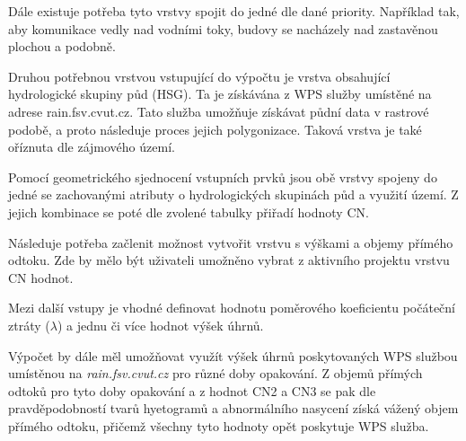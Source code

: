 \documentclass[a4paper,oneside,12pt]{book}
\begin{document}
\hspace{10mm}Dále existuje potřeba tyto vrstvy spojit do jedné dle dané priority. Například tak, aby komunikace vedly nad vodními toky, budovy se nacházely nad zastavěnou plochou a podobně.

\hspace{10mm}Druhou potřebnou vrstvou vstupující do výpočtu je vrstva obsahující hydrologické skupiny půd (HSG). Ta je získávána z WPS služby umístěné na adrese rain.fsv.cvut.cz. Tato služba umožňuje získávat půdní data v rastrové podobě, a proto následuje proces jejich polygonizace. Taková vrstva je také oříznuta dle zájmového území.

\hspace{10mm}Pomocí geometrického sjednocení vstupních prvků jsou obě vrstvy spojeny do jedné se zachovanými atributy o hydrologických skupinách půd a využití území.
Z jejich kombinace se poté dle zvolené tabulky přiřadí hodnoty CN.

\hspace{10mm} Následuje potřeba začlenit možnost vytvořit vrstvu s výškami a objemy přímého odtoku. Zde by mělo být uživateli umožněno vybrat z aktivního projektu vrstvu CN hodnot.

\hspace{10mm} Mezi další vstupy je vhodné definovat hodnotu poměrového koeficientu počáteční ztráty ($\lambda$) a jednu či více hodnot výšek úhrnů.

\hspace{10mm} Výpočet by dále měl umožňovat využít výšek úhrnů poskytovaných WPS službou umístěnou na \textit{rain.fsv.cvut.cz} pro různé doby opakování.  
Z objemů přímých odtoků pro tyto doby opakování a z hodnot CN2 a CN3 se pak dle pravděpodobností tvarů hyetogramů a abnormálního nasycení získá vážený objem přímého odtoku, přičemž všechny tyto hodnoty opět poskytuje WPS služba.
\end{document}
